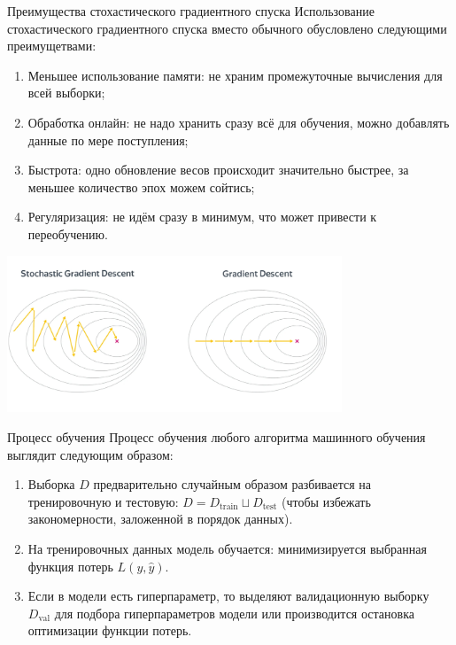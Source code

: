 \documentclass[notheorems, handout]{beamer}
\begin{document}
\begin{frame}{Преимущества стохастического градиентного спуска}
  Использование стохастического градиентного спуска вместо обычного
  обусловлено следующими преимущетвами:
  \begin{enumerate}
    \item Меньшее использование памяти: не храним промежуточные
      вычисления для всей выборки;
    \item Обработка онлайн: не надо хранить сразу всё для обучения,
      можно добавлять данные по мере поступления;
    \item Быстрота: одно обновление весов происходит значительно
      быстрее, за меньшее количество эпох можем сойтись;
    \item Регуляризация: не идём сразу в минимум, что может привести
      к переобучению.
  \end{enumerate}

  \begin{center}
    \includegraphics[width=0.75\textwidth]{img/stoch_grad_des.jpg}
  \end{center}
\end{frame}

\begin{frame}{Процесс обучения}
  Процесс обучения любого алгоритма машинного обучения выглядит
  следующим образом:
  \begin{enumerate}
    \item Выборка $D$ предварительно случайным образом разбивается на
      тренировочную и тестовую: $D=D_\text{train} \sqcup
      D_\text{test}$ (чтобы избежать закономерности, заложенной в
      порядок данных).\medskip
    \item На тренировочных данных модель обучается: минимизируется
      выбранная функция потерь $L(y, \hat y)$.\medskip
    \item Если в модели есть гиперпараметр, то выделяют валидационную
      выборку $D_\text{val}$ для подбора гиперпараметров модели или
      производится остановка оптимизации функции потерь.
  \end{enumerate}
\end{frame}
\end{document}
